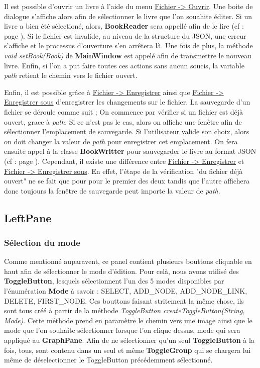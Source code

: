 				Il est possible d'ouvrir un livre à l'aide du menu \underline{Fichier -> Ouvrir}. Une boite de dialogue s'affiche alors afin de sélectionner le livre que l'on souahite éditer. Si un livre a bien été sélectioné, alors, \textbf{BookReader} sera appellé afin de le lire (cf :  page \pageref{subsec:lecture_ecriture_fichier}). Si le fichier est invalide, au niveau de la structure du JSON, une erreur s'affiche et le processus d'ouverture s'en arrêtera là. Une fois de plus, la méthode \textit{void setBook(Book)} de \textbf{MainWindow} est appelé afin de transmettre le nouveau livre. Enfin, si l'on a put faire toutes ces actions sans aucun soucis, la variable \textit{path} retient le chemin vers le fichier ouvert.

				Enfin, il est possible grâce à \underline{Fichier -> Enregistrer} ainsi que \underline{Fichier -> Enregistrer sous} d'enregistrer les changements sur le fichier. La sauvegarde d'un fichier se déroule comme suit ; On commence par vérifier si un fichier est déjà ouvert, grace à \textit{path}. Si ce n'est pas le cas, alors on affiche une fenêtre afin de sélectionner l'emplacement de sauvegarde. Si l'utilisateur valide son choix, alors on doit changer la valeur de \textit{path} pour enregistrer cet emplacement. On fera ensuite appel à la classe \textbf{BookWritter} pour sauvegarder le livre au format JSON (cf :  page \pageref{subsec:lecture_ecriture_fichier}). Cependant, il existe une différence entre \underline{Fichier -> Enregistrer} et \underline{Fichier -> Enregistrer sous}. En effet, l'étape de la vérification "du fichier déjà ouvert" ne se fait que pour pour le premier des deux tandis que l'autre affichera donc toujours la fenêtre de sauvegarde peut importe la valeur de \textit{path}.

		\subsection{LeftPane}

			\subsubsection{Sélection du mode}

				Comme mentionné auparavent, ce panel contient plusieurs bouttons cliquable en haut afin de sélectionner le mode d'édition. Pour celà, nous avons utilisé des \textbf{ToggleButton}, lesquels sélectionnent l'un des 5 modes disponibles par l'énumération \textbf{Mode} à savoir : SELECT, ADD\_NODE, ADD\_NODE\_LINK, DELETE, FIRST\_NODE. Ces bouttons faisant stritement la même chose, ils sont tous créé à partir de la méthode \textit{ToggleButton createToggleButton(String, Mode)}. Cette méthode prend en paramètre le chemin vers une image ainsi que le mode que l'on souhaite sélectionner lorsque l'on clique dessus, mode qui sera appliqué au \textbf{GraphPane}. Afin de ne sélectionner qu'un seul \textbf{ToggleButton} à la fois, tous, sont contenu dans un seul et même \textbf{ToggleGroup} qui se chargera lui même de déselectionner le ToggleButton précédemment sélectionné.

